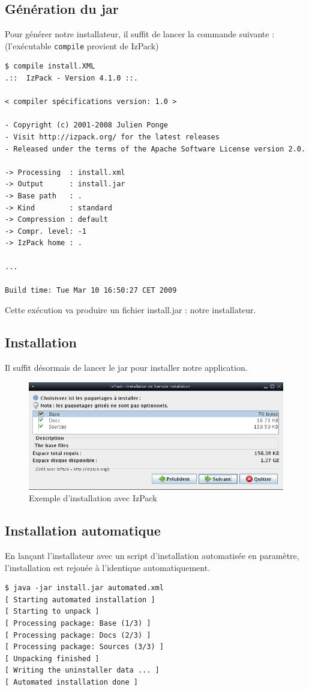 \subsection{Génération du jar}
Pour générer notre installateur, il suffit de lancer la commande suivante : (l'exécutable \verb|compile| provient de IzPack)
\begin{lstlisting}
$ compile install.XML
.::  IzPack - Version 4.1.0 ::.

< compiler spécifications version: 1.0 >

- Copyright (c) 2001-2008 Julien Ponge
- Visit http://izpack.org/ for the latest releases
- Released under the terms of the Apache Software License version 2.0.

-> Processing  : install.xml
-> Output      : install.jar
-> Base path   : .
-> Kind        : standard
-> Compression : default
-> Compr. level: -1
-> IzPack home : .

...

Build time: Tue Mar 10 16:50:27 CET 2009
\end{lstlisting}
Cette exécution va produire un fichier install.jar : notre installateur.
\subsection{Installation}
Il suffit désormais de lancer le jar pour installer notre application.
\begin{figure}[H]
	\centering
	\includegraphics[width=15cm]{../image/installSample.png}
	\caption{Exemple d'installation avec IzPack}
\end{figure}

\subsection{Installation automatique}
En lançant l'installateur avec un script d'installation automatisée en paramètre, l'installation est rejouée à l'identique automatiquement.
\begin{lstlisting}
$ java -jar install.jar automated.xml
[ Starting automated installation ]
[ Starting to unpack ]
[ Processing package: Base (1/3) ]
[ Processing package: Docs (2/3) ]
[ Processing package: Sources (3/3) ]
[ Unpacking finished ]
[ Writing the uninstaller data ... ]
[ Automated installation done ]
\end{lstlisting}

